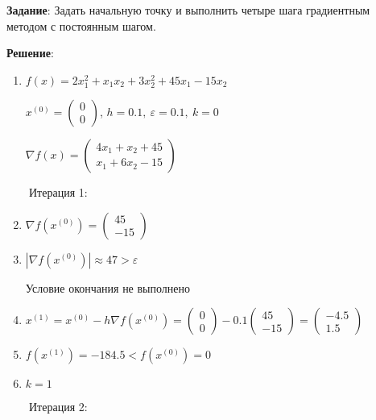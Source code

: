 \documentclass{article}
\begin{document}
\textbf{Задание}: Задать начальную точку и выполнить четыре шага градиентным методом с постоянным шагом.

\textbf{Решение}:

\begin{enumerate}
    \item
        $f(x) = 2x_1^2 + x_1x_2 + 3x_2^2 + 45x_1 - 15x_2$
        
        $x^{(0)} = \begin{pmatrix} 0 \\ 0 \end{pmatrix}$, 
        $h = 0.1, \ \varepsilon = 0.1, \ k= 0$
        
        $\nabla f(x) =
        \begin{pmatrix}
            4x_1 + x_2 + 45 \\
            x_1 + 6x_2 - 15
        \end{pmatrix}$
\end{enumerate}

\ \ \ \ Итерация 1:

\begin{enumerate}
    \setcounter{enumi}{1}
    \item $\nabla f(x^{(0)}) = \begin{pmatrix} 45 \\ -15 \end{pmatrix}$
    \item $|\nabla f(x^{(0)})| \approx 47 > \varepsilon$
    
        Условие окончания не выполнено
    \item $x^{(1)} = x^{(0)} - h\nabla f(x^{(0)}) =
        \begin{pmatrix} 0 \\ 0 \end{pmatrix} - 0.1
        \begin{pmatrix} 45 \\ -15 \end{pmatrix} =
        \begin{pmatrix} -4.5 \\ 1.5 \end{pmatrix}$
    \item $f(x^{(1)}) = -184.5 < f(x^{(0)}) = 0$
    \item $k = 1$
\end{enumerate}

\ \ \ \ Итерация 2:
\end{document}
